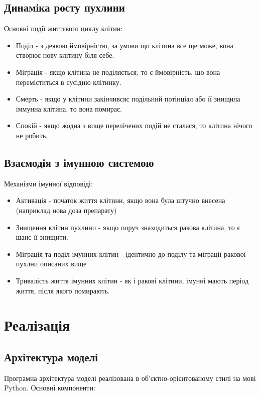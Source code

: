 \documentclass{article}
\begin{document}
\subsection{Динаміка росту пухлини}
Основні події життєвого циклу клітин:
\begin{itemize}
    \item Поділ - з деякою ймовірністю, за умови що клітина все ще може, вона створює нову клітину біля себе.
    \item Міграція - якщо клітина не поділяється, то є ймовірність, що вона переміститься в сусідню клітинку.
    \item Смерть - якщо у клітини закінчивсяс подільний потінціал або її знищила іммунна клітина, то вона помирає.
    \item Спокій - якщо жодна з вище перелічених подій не сталася, то клітина нічого не робить.
\end{itemize}

\subsection{Взаємодія з імунною системою}
Механізми імунної відповіді:
\begin{itemize}
    \item Активація - початок життя клітини, якщо вона була штучно внесена (наприклад нова доза препарату)
    \item Знищення клітин пухлини - якщо поруч знаходиться ракова клітина, то є шанс її знищити.
    \item Міграція та поділ імунних клітин - ідентично до поділу та міграції ракової пухлни описаних вище
    \item Тривалість життя імунних клітин - як і ракові клітини, імунні мають період життя, після якого помирають.
\end{itemize}

\section{Реалізація}
\subsection{Архітектура моделі}

Програмна архітектура моделі реалізована в об'єктно-орієнтованому стилі на мові Python. Основні компоненти:
\end{document}
